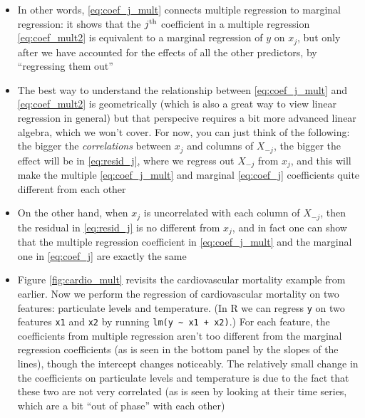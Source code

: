 \documentclass{article}
\begin{document}
\begin{itemize}
\item In other words, \eqref{eq:coef_j_mult} connects multiple regression to
  marginal regression: it shows that the $j^{\textnormal{th}}$ coefficient in a multiple
  regression \eqref{eq:coef_mult2} is equivalent to a marginal regression of $y$
  on $x_j$, but only after we have accounted for the effects of all the other
  predictors, by ``regressing them out'' 

\item The best way to understand the relationship between \eqref{eq:coef_j_mult}
  and \eqref{eq:coef_mult2} is geometrically (which is also a great way to view 
  linear regression in general) but that perspecive requires a bit more advanced
  linear algebra, which we won't cover. For now, you can just think of the
  following: the bigger the \emph{correlations} between $x_j$ and columns of
  $X_{-j}$, the bigger the effect will be in \eqref{eq:resid_j}, where we
  regress out $X_{-j}$ from $x_j$, and this will make the multiple
  \eqref{eq:coef_j_mult} and marginal \eqref{eq:coef_j} coefficients quite 
  different from each other

\item On the other hand, when $x_j$ is uncorrelated with each column of
  $X_{-j}$, then the residual  in \eqref{eq:resid_j} is
  no different from $x_j$, and in fact one can show that the multiple regression
  coefficient in \eqref{eq:coef_j_mult} and the marginal one in
  \eqref{eq:coef_j} are exactly the same

\item Figure \ref{fig:cardio_mult} revisits the cardiovascular mortality example
  from earlier. Now we perform the regression of cardiovascular mortality on two
  features: particulate levels and temperature. (In R we can regress \verb|y| on
  two features \verb|x1| and \verb|x2| by running \verb|lm(y ~ x1 + x2)|.) For
  each feature, the coefficients from multiple regression aren't too different
  from the marginal regression coefficients (as is seen in the bottom panel by
  the slopes of the lines), though the intercept changes noticeably. The 
  relatively small change in the coefficients on particulate levels and
  temperature is due to the fact that these two are not very correlated (as is
  seen by looking at their time series, which are a bit ``out of phase'' with
  each other) 


\end{itemize}
\end{document}
